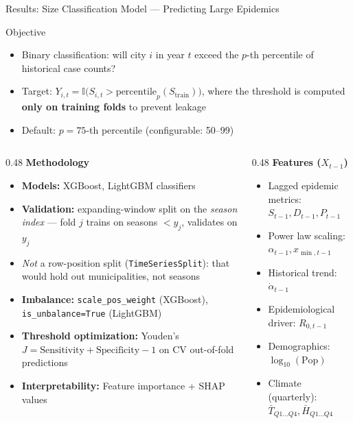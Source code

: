 \documentclass[10pt,aspectratio=169]{beamer}
\begin{document}
\begin{frame}{Results: Size Classification Model --- Predicting Large Epidemics}
\begin{block}{Objective}
\begin{itemize}
    \item Binary classification: will city $i$ in year $t$ exceed the $p$-th percentile of historical case counts?
    \item Target: $Y_{i,t} = \mathbb{I}\big(S_{i,t} > \text{percentile}_{p}(S_{\text{train}})\big)$, where the threshold is computed \textbf{only on training folds} to prevent leakage
    \item Default: $p = 75$-th percentile (configurable: 50--99)
\end{itemize}
\end{block}

\vspace{0.2cm}

\begin{columns}[T]
\begin{column}{0.48\textwidth}
\textbf{Methodology}
\begin{itemize}
    \item \textbf{Models:} XGBoost, LightGBM classifiers
    \item \textbf{Validation:} expanding-window split on the \emph{season index} --- fold $j$ trains on seasons $< y_j$, validates on $y_j$
    \item \emph{Not} a row-position split (\texttt{TimeSeriesSplit}): that would hold out municipalities, not seasons
    \item \textbf{Imbalance:} \texttt{scale\_pos\_weight} (XGBoost), \texttt{is\_unbalance=True} (LightGBM)
    \item \textbf{Threshold optimization:} Youden's $J = \text{Sensitivity} + \text{Specificity} - 1$ on CV out-of-fold predictions
    \item \textbf{Interpretability:} Feature importance + SHAP values
\end{itemize}
\end{column}

\begin{column}{0.48\textwidth}
\textbf{Features ($X_{t-1}$)}
\begin{itemize}
    \item Lagged epidemic metrics: $S_{t-1}, D_{t-1}, P_{t-1}$
    \item Power law scaling: $\alpha_{t-1}, x_{\min, t-1}$
    \item Historical trend: $\dot{\alpha}_{t-1}$
    \item Epidemiological driver: $R_{0, t-1}$
    \item Demographics: $\log_{10}(\text{Pop})$
    \item Climate (quarterly): $\bar{T}_{Q1\ldots Q4}, \bar{H}_{Q1\ldots Q4}$
\end{itemize}
\end{column}
\end{columns}


\end{frame}
\end{document}
